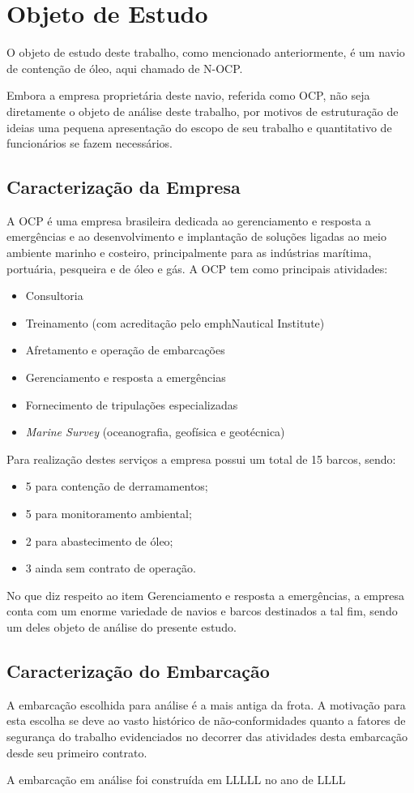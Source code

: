 \chapter{Objeto de Estudo}
O objeto de estudo deste trabalho, como mencionado anteriormente, é um navio de contenção de óleo, aqui chamado de N-OCP. 

Embora a empresa proprietária deste navio, referida como OCP, não seja diretamente o objeto de análise deste trabalho, por motivos de estruturação de ideias uma pequena apresentação do escopo de seu trabalho e quantitativo de funcionários se fazem necessários.

\section{Caracterização da Empresa}
A OCP é uma empresa brasileira dedicada ao gerenciamento e resposta a emergências e ao desenvolvimento e implantação de soluções ligadas ao meio ambiente marinho e costeiro, principalmente para as indústrias marítima, portuária, pesqueira e de óleo e gás.
A OCP tem como principais atividades:
\begin{itemize}
\item Consultoria
\item Treinamento (com acreditação pelo emph{Nautical Institute})
\item Afretamento e operação de embarcações
\item Gerenciamento e resposta a emergências
\item Fornecimento de tripulações especializadas
\item \emph{Marine Survey} (oceanografia, geofísica e geotécnica)
\end{itemize}

Para realização destes serviços a empresa possui um total de 15 barcos, sendo:
\begin{itemize}
\item 5 para contenção de derramamentos;
\item 5 para monitoramento ambiental;
\item 2 para abastecimento de óleo;
\item 3 ainda sem contrato de operação.
\end{itemize}

No que diz respeito ao item Gerenciamento e resposta a emergências, a empresa conta com um enorme variedade de navios e barcos destinados a tal fim, sendo um deles objeto de análise do presente estudo.

\section{Caracterização do Embarcação}
A embarcação escolhida para análise é a mais antiga da frota. A motivação para esta escolha se deve ao vasto histórico de não-conformidades quanto a fatores de segurança do trabalho evidenciados no decorrer das atividades desta embarcação desde seu primeiro contrato.

A embarcação em análise foi construída em LLLLL no ano de LLLL
